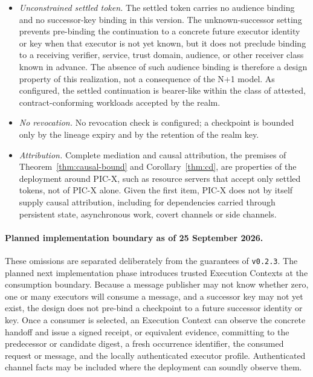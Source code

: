 \documentclass[10pt,twocolumn]{article}
\begin{document}
\begin{itemize}
    request-binding hook, but PIC-X's artifact-linked policy configures it to
    accept without establishing request binding because no trusted request or
    transport occurrence is available at that boundary. A checkpoint is
    therefore not tied to the request it continues.
    \item \emph{Unconstrained settled token.} The settled token carries no
    audience binding and no successor-key binding in this version. The
    unknown-successor setting prevents pre-binding the continuation to a
    concrete future executor identity or key when that executor is not yet
    known, but it does not preclude binding to a receiving verifier, service,
    trust domain, audience, or other receiver class known in advance. The
    absence of such audience binding is therefore a design property of this
    realization, not a consequence of the N+1 model. As configured, the
    settled continuation is bearer-like within the class of attested,
    contract-conforming workloads accepted by the realm.
    \item \emph{No revocation.} No revocation check is configured; a checkpoint
    is bounded only by the lineage expiry and by the retention of the realm key.
    \item \emph{Attribution.} Complete mediation and causal attribution, the
    premises of Theorem~\ref{thm:causal-bound} and
    Corollary~\ref{thm:cd}, are properties of the deployment around PIC-X,
    such as resource servers that accept only settled tokens, not of PIC-X
    alone. Given the first item, PIC-X does not by itself supply causal
    attribution, including for dependencies carried through persistent state,
    asynchronous work, covert channels or side channels.
\end{itemize}

\paragraph{Planned implementation boundary as of 25 September 2026.}
These omissions are separated deliberately from the guarantees of
\texttt{v0.2.3}. The planned next implementation phase introduces trusted
Execution Contexts at the consumption boundary. Because a message publisher
may not know whether zero, one or many executors will consume a message, and a
successor key may not yet exist, the design does not pre-bind a checkpoint to a
future successor identity or key. Once a consumer is selected, an Execution
Context can observe the concrete handoff and issue a signed receipt, or
equivalent evidence, committing to the predecessor or candidate digest, a
fresh occurrence identifier, the consumed request or message, and the locally
authenticated executor profile. Authenticated channel facts may be included
where the deployment can soundly observe them.
\end{document}
